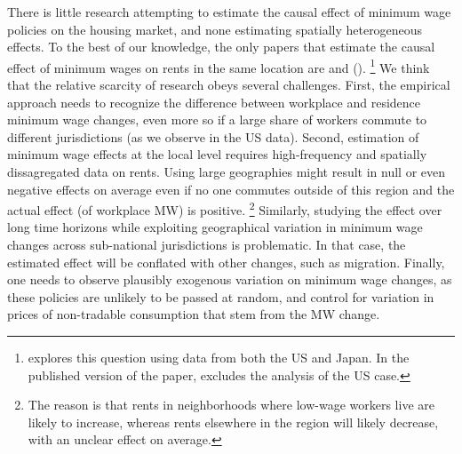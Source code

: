 
There is little research attempting to estimate the causal effect of minimum wage 
policies on the housing market, and none estimating spatially heterogeneous effects.
To the best of our knowledge, the only papers that estimate the causal effect of 
minimum wages on rents in the same location are \textcite{Tidemann2018} and 
\citeauthor{Yamagishi2019} (\citeyear{Yamagishi2019, Yamagishi2021}).%
\footnote{\textcite{Yamagishi2019} explores this question using data from both the
US and Japan. In the published version of the paper, \textcite{Yamagishi2021} 
excludes the analysis of the US case.}
We think that the relative scarcity of research obeys several challenges.
First, the empirical approach needs to recognize the difference between workplace
and residence minimum wage changes, even more so if a large share of workers
commute to different jurisdictions (as we observe in the US data).
Second, estimation of minimum wage effects at the local level requires high-frequency
and spatially dissagregated data on rents.
Using large geographies might result in null or even negative effects on average
even if no one commutes outside of this region and the actual effect (of workplace
MW) is positive.%
\footnote{The reason is that rents in neighborhoods where low-wage workers live 
are likely to increase, whereas rents elsewhere in the region will likely decrease, 
with an unclear effect on average.}
Similarly, studying the effect over long time horizons while exploiting geographical
variation in minimum wage changes across sub-national jurisdictions is problematic.
In that case, the estimated effect will be conflated with other changes, such as
migration.
Finally, one needs to observe plausibly exogenous variation on minimum wage changes,
as these policies are unlikely to be passed at random, and control for variation 
in prices of non-tradable consumption that stem from the MW change.


